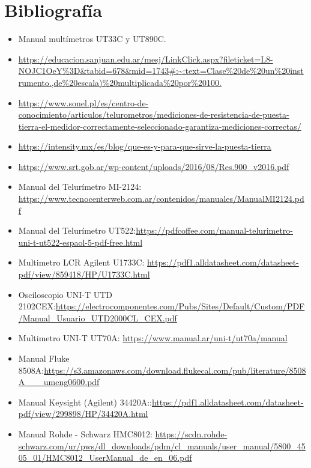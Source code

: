 \section{Bibliografía}
\begin{itemize}
    \item Manual multímetros UT33C y UT890C.
    \item \url{https://educacion.sanjuan.edu.ar/mesj/LinkClick.aspx?fileticket=L8-NOJC1OeY%3D&tabid=678&mid=1743#:~:text=Clase%20de%20un%20instrumento.,de%20escala)%20multiplicada%20por%20100.}
    
    \item \url{https://www.sonel.pl/es/centro-de-conocimiento/articulos/telurometros/mediciones-de-resistencia-de-puesta-tierra-el-medidor-correctamente-seleccionado-garantiza-mediciones-correctas/}

    \item \url{https://intensity.mx/es/blog/que-es-y-para-que-sirve-la-puesta-tierra}

    \item \url{https://www.srt.gob.ar/wp-content/uploads/2016/08/Res.900_v2016.pdf}
    
    \item Manual del Telurímetro MI-2124: \url{https://www.tecnocenterweb.com.ar/contenidos/manuales/ManualMI2124.pdf}

    \item Manual del Telurímetro UT522:\url{https://pdfcoffee.com/manual-telurimetro-uni-t-ut522-espaol-5-pdf-free.html}
   
    \item Multimetro LCR Agilent U1733C: \url{https://pdf1.alldatasheet.com/datasheet-pdf/view/859418/HP/U1733C.html}
    \item Osciloscopio UNI-T UTD 2102CEX:\url{https://electrocomponentes.com/Pubs/Sites/Default/Custom/PDF/Manual_Usuario_UTD2000CL_CEX.pdf}
    \item Multimetro UNI-T UT70A: \url{https://www.manual.ar/uni-t/ut70a/manual}
     \item Manual Fluke 8508A:\url{https://s3.amazonaws.com/download.flukecal.com/pub/literature/8508A___umeng0600.pdf}
    \item Manual Keysight (Agilent) 34420A::\url{https://pdf1.alldatasheet.com/datasheet-pdf/view/299898/HP/34420A.html}
    \item Manual Rohde - Schwarz HMC8012: \url{https://scdn.rohde-schwarz.com/ur/pws/dl_downloads/pdm/cl_manuals/user_manual/5800_4505_01/HMC8012_UserManual_de_en_06.pdf}
\end{itemize}


\newpage


